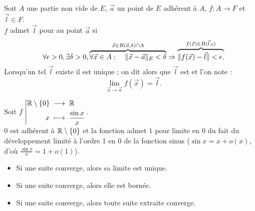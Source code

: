 \documentclass{book}
\begin{document}
\begin{Definition}[Limite]
Soit $A$ une partie non vide de $E$, $\vec{a}$ un point de $E$ adhérent à $A$, $f : A \to F$ et $\vec{l} \in F$.\\
$f$ admet $\vec{l}$ pour  au point $\vec{a}$ si
$$\forall \epsilon >0,  \exists \delta > 0,   \overbrace{\forall \vec{x} \in A: \quad  \mathopen\lVert \vec{x} - \vec{a} \mathclose\rVert_E < \delta}^{\vec{x}\in B(\vec{a},\delta)\cap A}   \Rightarrow \overbrace{\mathopen\lVert f (\vec{x}) - \vec{l} \mathclose\rVert < \epsilon.}^{f(\vec{x})\in B(\vec{l},\epsilon)}$$
Lorsqu'un tel $\vec{l}$ existe il est unique ; on dit alors que $\vec{l}$ est  et l'on note :
$$\lim_{\vec{x}\to\vec{a} } f(\vec{x})= \vec{l}.$$
\end{Definition}
\begin{Exemple}
Soit ${f}\left|\begin{aligned}{\mathbb{R}\setminus \{0\}}&\;\longrightarrow\;{\mathbb{R}}\\{x}&\;\longmapsto\;{\frac{\sin x }{x}}\end{aligned}\right. $.\\
 $0$ est adhérent à $\mathbb{R}\setminus \{0\}$ et la fonction admet $1$ pour limite en $0$ du fait du développement limité à l'ordre 1 en 0 de la fonction sinus ($\sin x = x + o(x)$, d'où $\frac{\sin x}{x} = 1 + o(1)$).
\end{Exemple}
\begin{Remarque}
\begin{itemize}
\item Si une suite converge, alors sa limite est unique.
\item Si une suite converge, alors elle est bornée.
\item Si une suite converge, alors toute suite extraite converge.
\end{itemize}
\end{Remarque}

\end{document}

